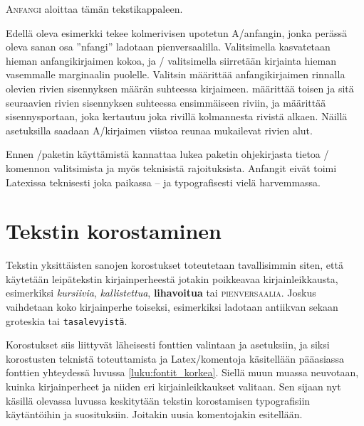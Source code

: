 \begin{koodilohkosis}
\lettrine[lines=3, loversize=.06, lhang=.02, findent=-5bp,
  nindent=4bp, slope=4bp]{A}{nfangi} aloittaa tämän tekstikappaleen.
\end{koodilohkosis}

Edellä oleva esimerkki tekee kolmerivisen upotetun A\-/anfangin, jonka
perässä oleva sanan osa ''nfangi'' ladotaan pienversaalilla.
Valitsimella  kasvatetaan hieman anfangikirjaimen
kokoa, ja \-/ valitsimella siirretään kirjainta hieman
vasemmalle marginaalin puolelle. Valitsin  määrittää
anfangikirjaimen rinnalla olevien rivien sisennyksen määrän suhteessa
kirjaimeen.  määrittää toisen ja sitä seuraavien rivien
sisennyksen suhteessa ensimmäiseen riviin, ja  määrittää
sisennysportaan, joka kertautuu joka rivillä kolmannesta rivistä alkaen.
Näillä asetuksilla saadaan A\-/kirjaimen viistoa reunaa mukailevat
rivien alut.

Ennen \-/paketin käyttämistä kannattaa lukea paketin
ohjekirjasta tietoa \-/ komennon valitsimista ja myös
teknisistä rajoituksista. Anfangit eivät toimi Latexissa teknisesti joka
paikassa -- ja typografisesti vielä harvemmassa.

\section{Tekstin korostaminen}
\label{luku:korostus}

Tekstin yksittäisten sanojen korostukset toteutetaan tavallisimmin
siten, että käytetään leipätekstin kirjainperheestä jotakin poikkeavaa
kirjainleikkausta, esimerkiksi \textit{kursiivia},
\textsl{kallistettua}, \textbf{lihavoitua} tai \textsc{pienversaalia}.
Joskus vaihdetaan koko kirjainperhe toiseksi, esimerkiksi ladotaan
\textrm{antiikvan} sekaan \textsf{groteskia} tai \texttt{tasalevyistä}.

Korostukset siis liittyvät läheisesti fonttien valintaan ja asetuksiin,
ja siksi korostusten teknistä toteuttamista ja Latex\-/komentoja
käsitellään pääasiassa fonttien yhteydessä luvussa
\ref{luku:fontit_korkea}.  Siellä muun muassa neuvotaan,
kuinka kirjainperheet ja niiden eri kirjainleikkaukset valitaan. Sen
sijaan nyt käsillä olevassa luvussa keskitytään tekstin korostamisen
typografisiin käytäntöihin ja suosituksiin. Joitakin uusia komentojakin
esitellään.

